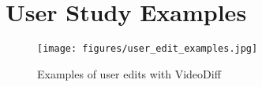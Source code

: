 
\section{User Study Examples}
\begin{figure*}[h!]
  \centering
  \texttt{[image: figures/user\_edit\_examples.jpg]}
  \caption{Examples of user edits with VideoDiff}\label{fig:user_edit_examples}
\end{figure*}